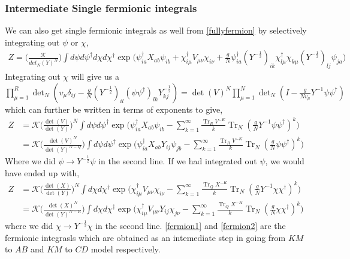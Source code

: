 \documentclass[english]{article}
\DeclareMathOperator{\Tr}{Tr}
\newcommand{\half}{\frac{1}{2}}
\renewcommand{\>}{\rangle}
\newcommand{\<}{\langle}
\renewcommand{\(}{\left(}
\renewcommand{\)}{\right)}
\begin{document}
\subsubsection*{Intermediate Single fermionic integrals}
We can also get single fermionic integrals as well from  \eqref{fullyfermion} by selectively integrating out $\psi$ or $\chi$,
\begin{align}
    Z=\bigg(\frac{\mathcal{K}}{det_N(Y)^N}\bigg)\int d\psi d\psi^{\dagger}d\chi d\chi^{\dagger}\exp\bigg(\psi^{\dagger}_{ia}X_{ab}\psi_{ib}+\chi^{\dagger}_{i\mu}V_{\mu\nu}\chi_{i\nu}+\frac{g}{N}\psi^{\dagger}_{ia}(Y^{-\half})_{ik}\chi_{l\mu}^{\dagger}\chi_{k\mu}(Y^{-\half})_{lj}\psi_{ja}\bigg)
\end{align}
Integrating out $\chi$ will give us a $\prod_{\mu=1}^R\det_{N}(v_{\mu}\delta_{ij}-\frac{g}{N}(Y^{-\half})_{il}(\psi\psi^{\dagger})_{lk}Y^{-\half}_{kj})=\det(V)^N\prod_{\mu=1}^N\det_N(I - \frac{g}{Nv_{\mu}}Y^{-1}\psi\psi^{\dagger})$ which can further be written in terms of exponents to give,
\begin{align}\label{fermion1}
    Z&=\mathcal{K}\bigg(\frac{\det(V)}{\det(Y)}\bigg)^N\int d\psi d\psi^{\dagger}\exp\bigg(\psi^{\dagger}_{ia}X_{ab}\psi_{ib} - \sum_{k=1}^{\infty}\frac{\Tr_{R}V^{-K}}{k}\Tr_N(\frac{g}{N}Y^{-1}\psi\psi^{\dagger})^k\bigg) \nonumber\\
    &=\mathcal{K}\bigg(\frac{\det(V)^N}{\det(Y)^{N-Q}}\bigg)\int d\psi d\psi^{\dagger}\exp\bigg(\psi^{\dagger}_{ia}X_{ab}Y_{ij}\psi_{jb} - \sum_{k=1}^{\infty}\frac{\Tr_{R}V^{-K}}{k}\Tr_N(\frac{g}{N}\psi\psi^{\dagger})^k\bigg)
\end{align}
Where we did $\psi \to Y^{-\half}\psi$ in the second line. If we had integrated out $\psi$, we would have ended up with,
\begin{align}\label{fermion2}
    Z&=\mathcal{K}\bigg(\frac{\det(X)}{\det(Y)}\bigg)^N\int d\chi d\chi^{\dagger}\exp\bigg(\chi^{\dagger}_{i\mu}V_{\mu\nu}\chi_{i\nu} -\sum_{k=1}^{\infty}\frac{\Tr_{Q}X^{-K}}{k}\Tr_N(\frac{g}{N}Y^{-1}\chi\chi^{\dagger})^k\bigg)\nonumber\\
    &=\mathcal{K}\bigg(\frac{\det(X)^N}{\det(Y)^{N-R}}\bigg)\int d\chi d\chi^{\dagger}\exp\bigg(\chi^{\dagger}_{i\mu}V_{\mu\nu}Y_{ij}\chi_{j\nu} - \sum_{k=1}^{\infty}\frac{\Tr_{Q}X^{-K}}{k}\Tr_N(\frac{g}{N}\chi\chi^{\dagger})^k\bigg)
\end{align}
where we did $\chi \to Y^{-\half}\chi$ in the second line. \eqref{fermion1} and \eqref{fermion2} are the fermionic integrasls which are obtained as an intemediate step in going from $KM$ to $AB$ and $KM$ to $CD$ model respectively.
\end{document}
